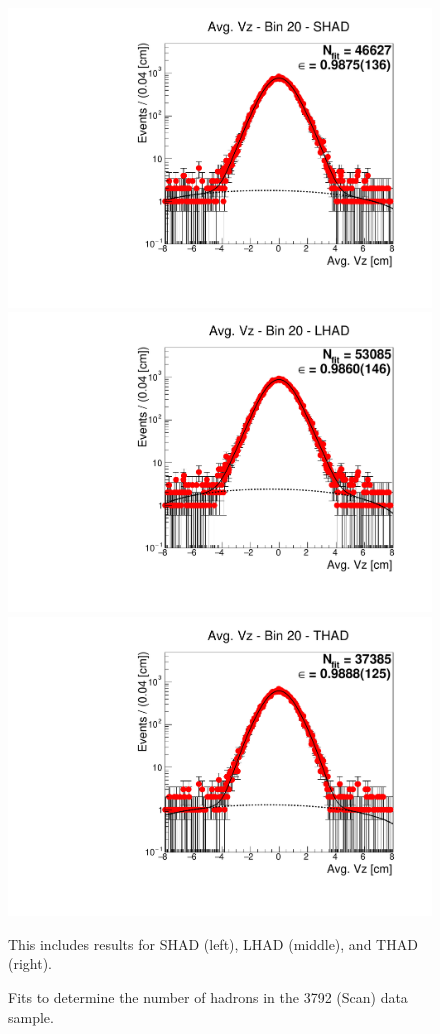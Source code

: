 \begin{figure}[H]
\centering
\includegraphics[scale=0.25]{figures/plots/nonDDbar_fit_results/scan/fit_scan_20_data_SHAD.pdf}
\hspace{-0.5cm}
\includegraphics[scale=0.25]{figures/plots/nonDDbar_fit_results/scan/fit_scan_20_data_LHAD.pdf}
\hspace{-0.5cm}
\includegraphics[scale=0.25]{figures/plots/nonDDbar_fit_results/scan/fit_scan_20_data_THAD.pdf}
\caption{Fits to determine the number of hadrons in the 3792 (Scan) data sample.}
{This includes results for SHAD (left), LHAD (middle), and THAD (right).}
\label{fig:hadron_fits_scan_20}
\end{figure}

